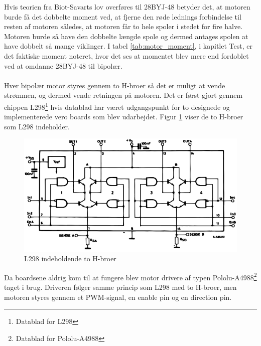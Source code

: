 \noindent
Hvis teorien fra Biot-Savarts lov overføres til 28BYJ-48 betyder det, at motoren burde få det dobbelte moment ved, at fjerne den røde lednings forbindelse til resten af motoren således, at motoren får to hele spoler i stedet for fire halve. Motoren burde så have den dobbelte længde spole og dermed antages spolen at have dobbelt så mange viklinger. I tabel \ref{tab:motor_moment}, i kapitlet Test, er det faktiske moment noteret, hvor det ses at momentet blev mere end fordoblet ved at omdanne 28BYJ-48 til bipolær.
\\
\\
Hver bipolær motor styres gennem to H-broer så det er muligt at vende strømmen, og dermed vende retningen på motoren. Det er først gjort gennem chippen L298\footnote{Datablad for L298} hvis datablad har været udgangspunkt for to designede og implementerede vero boards som blev udarbejdet. Figur \ref{fig:L298} viser de to H-broer som L298 indeholder.

\begin{figure}[H]
	\centerline{\includegraphics[scale=0.33]{tex/Design/L298}}
	\caption{L298 indeholdende to H-broer}
	\label{fig:L298}
\end{figure}

\noindent
Da boardsene aldrig kom til at fungere blev motor drivere af typen Pololu-A4988\footnote{Datablad for Pololu-A4988} taget i brug. Driveren følger samme princip som L298 med to H-broer, men motoren styres gennem et PWM-signal, en enable pin og en direction pin.